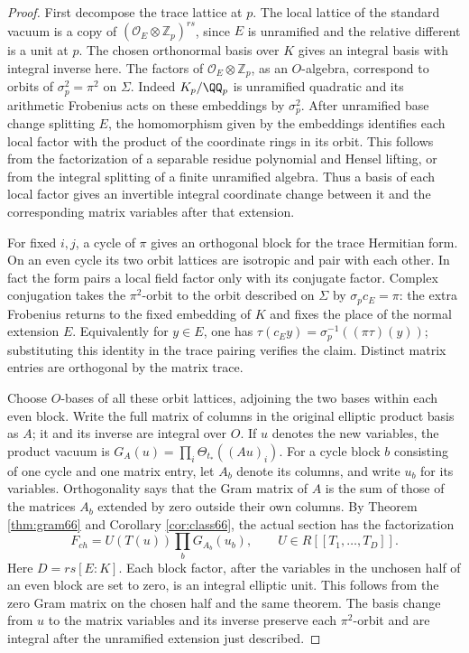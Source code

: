 \documentclass[a4paper,11pt]{article}
\theoremstyle{definition}
\theoremstyle{remark}
\newcommand{\ZZ}{\mathbb Z}\newcommand{\ord}{\operatorname{ord}}
\numberwithin{equation}{section}
\begin{document}
\begin{proof}
First decompose the trace lattice at \(p\). The local lattice
of the standard vacuum is a copy of
\((\mathcal O_E\otimes\ZZ_p)^{rs}\), since \(E\) is unramified
and the relative different is a unit at \(p\). The chosen
orthonormal basis over \(K\) gives an integral basis with integral
inverse here. The factors of \(\mathcal O_E\otimes\ZZ_p\), as an
\(O\)-algebra, correspond to orbits of \(\sigma_p^2=\pi^2\) on
\(\Sigma\). Indeed \(K_p/\QQ_p\) is unramified quadratic and its
arithmetic Frobenius acts on these embeddings by \(\sigma_p^2\).
After unramified base change splitting \(E\), the homomorphism
given by the embeddings identifies each local factor with the
product of the coordinate rings in its orbit. This follows from
the factorization of a separable residue polynomial and Hensel
lifting, or from the integral splitting of a finite unramified
algebra. Thus a basis of each local factor gives an invertible
integral coordinate change between it and the corresponding
matrix variables after that extension.

For fixed \(i,j\), a cycle of \(\pi\) gives an orthogonal block
for the trace Hermitian form. On an even cycle its two orbit
lattices are isotropic and pair with each other. In fact the form
pairs a local field factor only with its conjugate factor.
Complex conjugation takes the \(\pi^2\)-orbit to the orbit
described on \(\Sigma\) by \(\sigma_pc_E=\pi\): the extra
Frobenius returns to the fixed embedding of \(K\) and fixes
the place of the normal extension \(E\). Equivalently for
\(y\in E\), one has
\(\tau(c_Ey)=\sigma_p^{-1}((\pi\tau)(y))\); substituting this
identity in the trace pairing verifies the claim. Distinct matrix
entries are orthogonal by the matrix trace.

Choose \(O\)-bases of all these orbit lattices, adjoining the
two bases within each even block. Write the full matrix of
columns in the original elliptic product basis as \(A\); it and
its inverse are integral over \(O\). If \(u\) denotes the new
variables, the product vacuum is \(G_A(u)=\prod_i\Theta_{t_*}((Au)_i)\).
For a cycle block \(b\) consisting of one cycle and one matrix
entry, let \(A_b\) denote its columns, and write \(u_b\) for
its variables. Orthogonality says that the Gram matrix of \(A\)
is the sum of those of the matrices \(A_b\) extended by zero
outside their own columns. By
Theorem \ref{thm:gram66} and Corollary \ref{cor:class66}, the actual section has the factorization
\[
             F_{ch}=U(T(u))\prod_b G_{A_b}(u_b),
             \qquad U\in R[[T_1,\ldots,T_D]] .
\]
Here \(D=rs[E:K]\). Each block factor, after the variables in
the unchosen half of an even block are set to zero, is an
integral elliptic unit. This follows from the zero Gram matrix
on the chosen half and the same theorem. The basis change from
\(u\) to the matrix variables and its inverse preserve each
\(\pi^2\)-orbit and are integral after the unramified extension
just described.


\end{proof}
\end{document}

